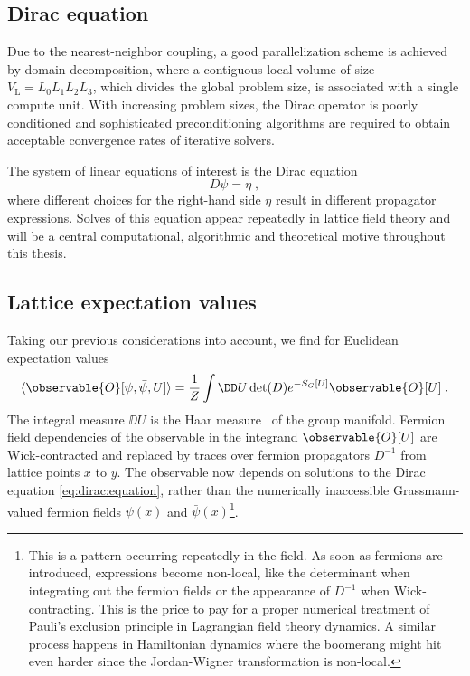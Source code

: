 \subsection{Dirac equation}

Due to the nearest-neighbor coupling, a good parallelization scheme is achieved by domain decomposition, where a contiguous local volume of size $V_\mathrm{L}=L_0 L_1 L_2 L_3$, which divides the global problem size, is associated with a single compute unit.
With increasing problem sizes, the Dirac operator is poorly conditioned and sophisticated preconditioning algorithms are required to obtain acceptable convergence rates of iterative solvers.

The system of linear equations of interest is the Dirac equation
\begin{equation} \label{eq:dirac:equation}
  D \psi = \eta \;,
\end{equation}
where different choices for the right-hand side $\eta$ result in different propagator expressions.
Solves of this equation appear repeatedly in lattice field theory and will be a central computational, algorithmic and theoretical motive throughout this thesis.

\subsection{Lattice expectation values}

Taking our previous considerations into account, we find for Euclidean expectation values
\begin{equation} \label{eq:eclidean:exp:value}
\langle \observable{O}[\psi, \bar{\psi}, U] \rangle =
\frac{1}{Z}
\int \DD U
\det(D) e^{- S_G[U]}
\observable{O}[U] \;.
\end{equation}
The integral measure $\DD U$ is the Haar measure~\cite{haar1933} of the group manifold.
Fermion field dependencies of the observable in the integrand $\observable{O}[U]$ are Wick-contracted and replaced by traces over fermion propagators $D^{-1}$ from lattice points $x$ to $y$.
The observable now depends on solutions to the Dirac equation \cref{eq:dirac:equation}, rather than the numerically inaccessible Grassmann-valued fermion fields $\psi(x)$ and $\bar{\psi}(x)$\footnote{This is a pattern occurring repeatedly in the field. As soon as fermions are introduced, expressions become non-local, like the determinant when integrating out the fermion fields or the appearance of $D^{-1}$ when Wick-contracting. This is the price to pay for a proper numerical treatment of Pauli's exclusion principle in Lagrangian field theory dynamics. A similar process happens in Hamiltonian dynamics where the boomerang might hit even harder since the Jordan-Wigner transformation is non-local.}.

